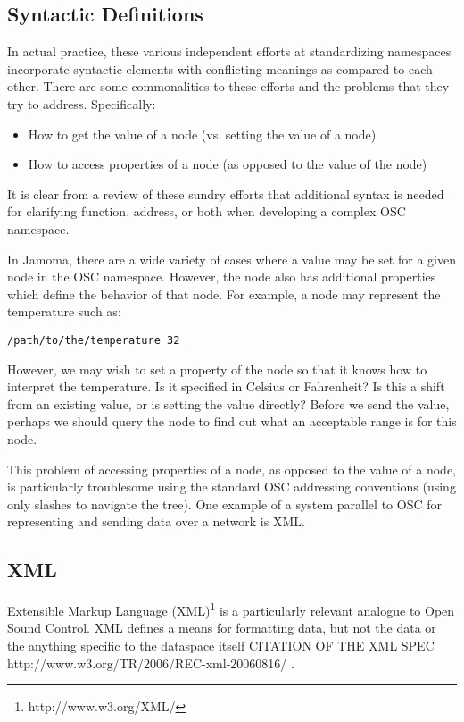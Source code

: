 \documentclass{sig-alternate}
\begin{document}
\subsection{Syntactic Definitions} %
\label{sub:litterature_review}
   
In actual practice, these various independent efforts at standardizing namespaces incorporate syntactic elements with conflicting meanings as compared to each other.  There are some commonalities to these efforts and the problems that they try to address.  Specifically:
\begin{itemize}
	\item How to get the value of a node (vs. setting the value of a node) 
	\item How to access properties of a node (as opposed to the value of the node)
\end{itemize}

It is clear from a review of these sundry efforts that additional syntax is needed for clarifying function, address, or both when developing a complex OSC namespace.

In Jamoma, there are a wide variety of cases where a value may be set for a given node in the OSC namespace.  However, the node also has additional properties which define the behavior of that node.  For example, a node may represent the temperature such as:

\texttt{/path/to/the/temperature 32}

However, we may wish to set a property of the node so that it knows how to interpret the temperature.  Is it specified in Celsius or Fahrenheit?  Is this a shift from an existing value, or is setting the value directly?  Before we send the value, perhaps we should query the node to find out what an acceptable range is for this node.

This problem of accessing properties of a node, as opposed to the value of a node, is particularly troublesome using the standard OSC addressing conventions (using only slashes to navigate the tree).  One example of a system parallel to OSC for representing and sending data over a network is XML.


\subsection{XML} %
\label{sub:xml}

Extensible Markup Language (XML)\footnote{http://www.w3.org/XML/} is a particularly relevant analogue to Open Sound Control.  XML defines a means for formatting data, but not the data or the anything specific to the dataspace itself CITATION OF THE XML SPEC http://www.w3.org/TR/2006/REC-xml-20060816/ .  
\end{document}
